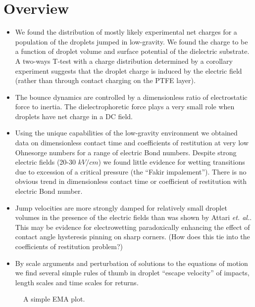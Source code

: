 \documentclass[10pt,a4paper]{article}
\author{Erin Schmidt}
\begin{document}
\doublespacing
\section{Overview}
\begin{itemize}
\item We found the distribution of mostly likely experimental net charges for a population of the droplets jumped in low-gravity. We found the charge to be a function of droplet volume and surface potential of the dielectric substrate. A two-ways T-test with a charge distribution determined by a corollary experiment suggests that the droplet charge is induced by the electric field (rather than through contact charging on the PTFE layer).

\item The bounce dynamics are controlled by a dimensionless ratio of electrostatic force to inertia. The dielectrophoretic force plays a very small role when droplets have net charge in a DC field.  

\item Using the unique capabilities of the low-gravity environment we obtained data on dimensionless contact time and coefficients of restitution at very low Ohnesorge numbers for a range of electric Bond numbers. Despite strong electric fields (20-30 $kV/cm$) we found little evidence for wetting transitions due to excession of a critical pressure (the ``Fakir impalement''). There is no obvious trend in dimensionless contact time or coefficient of restitution with electric Bond number.

\item Jump velocities are more strongly damped for relatively small droplet volumes in the presence of the electric fields than was shown by Attari \emph{et. al.}. This may be evidence for electrowetting paradoxically enhancing the effect of contact angle hysteresis pinning on sharp corners. (How does this tie into the coefficients of restitution problem?)

\item By scale arguments and perturbation of solutions to the equations of motion we find several simple rules of thumb in droplet ``escape velocity'' of impacts, length scales and time scales for returns.
\end{itemize}

\begin{figure}[htb]
    \centering
    
    \caption{A simple EMA plot.\label{fig:charge}}
\end{figure}
\end{document}
